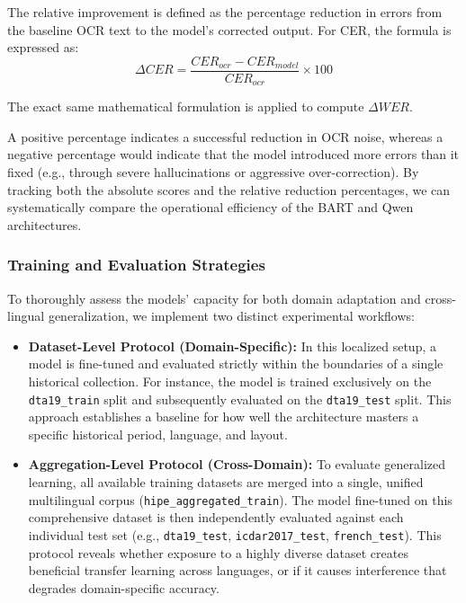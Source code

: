 \documentclass[11pt]{extarticle}
\begin{document}
The relative improvement is defined as the percentage reduction in errors from the baseline OCR text to the model's corrected output. For CER, the formula is expressed as:
\begin{equation}
    \Delta CER = \frac{CER_{ocr} - CER_{model}}{CER_{ocr}} \times 100
\end{equation}

The exact same mathematical formulation is applied to compute $\Delta WER$. 

A positive percentage indicates a successful reduction in OCR noise, whereas a negative percentage would indicate that the model introduced more errors than it fixed (e.g., through severe hallucinations or aggressive over-correction). By tracking both the absolute scores and the relative reduction percentages, we can systematically compare the operational efficiency of the BART and Qwen architectures.

\subsubsection{Training and Evaluation Strategies}
To thoroughly assess the models' capacity for both domain adaptation and cross-lingual generalization, we implement two distinct experimental workflows:

\begin{itemize}
    \item \textbf{Dataset-Level Protocol (Domain-Specific):} In this localized setup, a model is fine-tuned and evaluated strictly within the boundaries of a single historical collection. For instance, the model is trained exclusively on the \texttt{dta19\_train} split and subsequently evaluated on the \texttt{dta19\_test} split. This approach establishes a baseline for how well the architecture masters a specific historical period, language, and layout.
    
    \item \textbf{Aggregation-Level Protocol (Cross-Domain):} To evaluate generalized learning, all available training datasets are merged into a single, unified multilingual corpus (\texttt{hipe\_aggregated\_train}). The model fine-tuned on this comprehensive dataset is then independently evaluated against each individual test set (e.g., \texttt{dta19\_test}, \texttt{icdar2017\_test}, \texttt{french\_test}). This protocol reveals whether exposure to a highly diverse dataset creates beneficial transfer learning across languages, or if it causes interference that degrades domain-specific accuracy.
\end{itemize}
\end{document}
